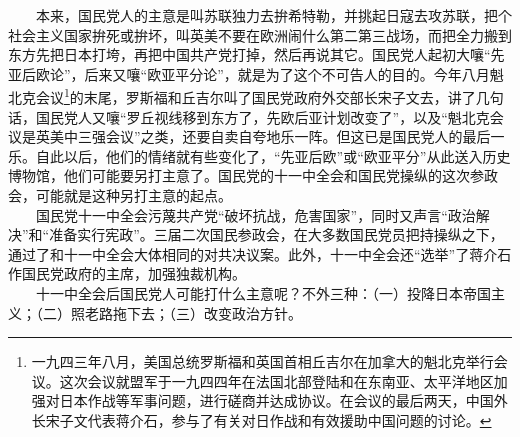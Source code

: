 \documentclass[cn,11pt,chinese]{elegantbook}
\begin{document}
　　本来，国民党人的主意是叫苏联独力去拚希特勒，并挑起日寇去攻苏联，把个社会主义国家拚死或拚坏，叫英美不要在欧洲闹什么第二第三战场，而把全力搬到东方先把日本打垮，再把中国共产党打掉，然后再说其它。国民党人起初大嚷“先亚后欧论”，后来又嚷“欧亚平分论”，就是为了这个不可告人的目的。今年八月魁北克会议\footnote[1]{ 一九四三年八月，美国总统罗斯福和英国首相丘吉尔在加拿大的魁北克举行会议。这次会议就盟军于一九四四年在法国北部登陆和在东南亚、太平洋地区加强对日本作战等军事问题，进行磋商并达成协议。在会议的最后两天，中国外长宋子文代表蒋介石，参与了有关对日作战和有效援助中国问题的讨论。}的末尾，罗斯福和丘吉尔叫了国民党政府外交部长宋子文去，讲了几句话，国民党人又嚷“罗丘视线移到东方了，先欧后亚计划改变了”，以及“魁北克会议是英美中三强会议”之类，还要自卖自夸地乐一阵。但这已是国民党人的最后一乐。自此以后，他们的情绪就有些变化了，“先亚后欧”或“欧亚平分”从此送入历史博物馆，他们可能要另打主意了。国民党的十一中全会和国民党操纵的这次参政会，可能就是这种另打主意的起点。\\
　　国民党十一中全会污蔑共产党“破坏抗战，危害国家”，同时又声言“政治解决”和“准备实行宪政”。三届二次国民参政会，在大多数国民党员把持操纵之下，通过了和十一中全会大体相同的对共决议案。此外，十一中全会还“选举”了蒋介石作国民党政府的主席，加强独裁机构。\\
　　十一中全会后国民党人可能打什么主意呢？不外三种：（一）投降日本帝国主义；（二）照老路拖下去；（三）改变政治方针。\\
\end{document}
